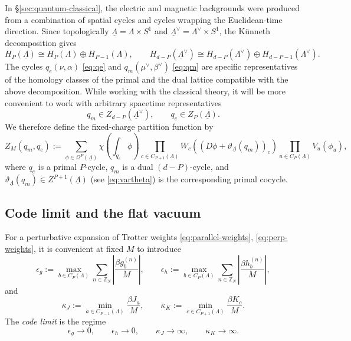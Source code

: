 \documentclass[dvipsnames,a4paper]{article}
\numberwithin{equation}{section}
\theoremstyle{definition}
\theoremstyle{remark}
\begin{document}
In \S\ref{sec:quantum-classical}, the electric and magnetic backgrounds were produced
from a combination of spatial cycles and cycles wrapping the Euclidean-time direction. Since topologically
\(\underline\Lambda=\Lambda\times S^1\) and
\(\underline\Lambda^\vee=\Lambda^\vee\times S^1\), the K\"unneth decomposition gives
\begin{equation}
	H_P(\underline\Lambda)
	\cong
	H_P(\Lambda)\oplus H_{P-1}(\Lambda),
	\qquad
	H_{d-P}(\underline\Lambda^\vee)
	\cong
	H_{d-P}(\Lambda^\vee)\oplus H_{d-P-1}(\Lambda^\vee).
	\label{eq:kunneth}
\end{equation}
The cycles $q_e(\nu,\alpha)$ \eqref{eq:qe} and $q_m(\mu^\vee,\beta^\vee)$ \eqref{eq:qm} are specific representatives of the homology classes of the primal and the dual lattice compatible with the above decomposition. While working with the classical theory, it will be more convenient to work with arbitrary spacetime representatives
\begin{equation}
	q_m\in Z_{d-P}(\underline\Lambda^\vee),
	\qquad
	q_e\in Z_P(\underline\Lambda).
\end{equation}
We therefore define the fixed-charge partition function by
\begin{equation}
	Z_M(q_m,q_e)
	:=
	\sum_{\phi\in \Omega^P(\underline\Lambda)}
	\chi \left(\int_{q_e}\phi\right)
	\prod_{c\in C_{P+1}(\underline\Lambda)}
	W_c \left((D\phi+\vartheta_{\underline\Lambda}(q_m))_c\right)
	\prod_{u\in C_P(\underline\Lambda)}
	V_u(\phi_u),
	\label{eq:Zme}
\end{equation}
where \(q_e\) is a primal \(P\)-cycle, \(q_m\) is a dual \((d-P)\)-cycle, and
\(\vartheta_{\underline\Lambda}(q_m)\in Z^{P+1}(\underline\Lambda)\) (see \eqref{eq:vartheta}) is the corresponding
primal cocycle.


\subsection{Code limit and the flat vacuum}
\label{sec:fixed-charge-code-limit}

For a perturbative expansion of Trotter weights \eqref{eq:parallel-weights}, \eqref{eq:perp-weights}, it is convenient at fixed
\(M\) to introduce
\begin{equation}
	\epsilon_g
	:=
	\max_{b\in C_P(\Lambda)}
	\sum_{n\in \mathbb Z_N}\left|\frac{\beta g_b^{(n)}}{M}\right|,
	\qquad
	\epsilon_h
	:=
	\max_{b\in C_P(\Lambda)}
	\sum_{n\in \mathbb Z_N}\left|\frac{\beta h_b^{(n)}}{M}\right|,
\end{equation}
and
\begin{equation}
	\kappa_J
	:=
	\min_{a\in C_{P-1}(\Lambda)}\frac{\beta J_a}{M},
	\qquad
	\kappa_K
	:=
	\min_{c\in C_{P+1}(\Lambda)}\frac{\beta K_c}{M}.
\end{equation}
The \emph{code limit} is the regime
\begin{equation}
	\epsilon_g\to 0,
	\qquad
	\epsilon_h\to 0,
	\qquad
	\kappa_J\to \infty,
	\qquad
	\kappa_K\to \infty.
	\label{eq:codeLimit}
\end{equation}
\end{document}
